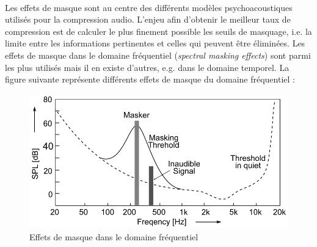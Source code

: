 \documentclass{article}
\begin{document}
    \paragraph{}
    Les effets de masque sont au centre des différents modèles psychoacoustiques utilisés pour la compression audio. L'enjeu afin d'obtenir le meilleur taux de compression est de calculer le plus finement possible les seuils de masquage, i.e. la limite entre les informations pertinentes et celles qui peuvent être éliminées. Les effets de masque dans le domaine fréquentiel (\emph{spectral masking effects}) sont parmi les plus utilisés mais il en existe d'autres, e.g. dans le domaine temporel. La figure suivante représente différents effets de masque du domaine fréquentiel :
    \begin{figure}[H]
        \centering
        \includegraphics[width=.6\linewidth]{./images/2019-Herre-Dick-masking-effect.png}
        \caption{Effets de masque dans le domaine fréquentiel}
    \end{figure}

\end{document}
